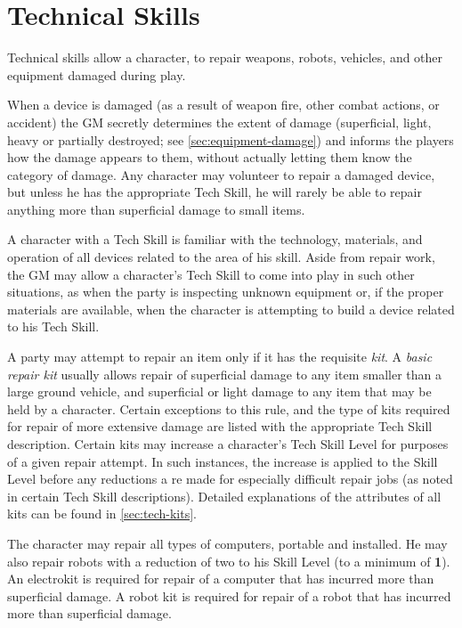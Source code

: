 \section{Technical Skills}
\label{sec:technical-skills}

Technical skills allow a character, to repair weapons, robots,
vehicles, and other equipment damaged during play.

When a device is damaged (as a result of weapon fire, other combat
actions, or accident) the GM secretly determines the extent of damage
(superficial, light, heavy or partially destroyed; see
\ref{sec:equipment-damage}) and informs the players how the damage
appears to them, without actually letting them know the category of
damage.  Any character may volunteer to repair a damaged device, but
unless he has the appropriate Tech Skill, he will rarely be able to
repair anything more than superficial damage to small items.

A character with a Tech Skill is familiar with the technology,
materials, and operation of all devices related to the area of his
skill.  Aside from repair work, the GM may allow a character's Tech
Skill to come into play in such other situations, as when the party is
inspecting unknown equipment or, if the proper materials are
available, when the character is attempting to build a device related
to his Tech Skill.

A party may attempt to repair an item only if it has the requisite
\emph{kit}.  A \emph{basic repair kit} usually allows repair of
superficial damage to any item smaller than a large ground vehicle,
and superficial or light damage to any item that may be held by a
character.  Certain exceptions to this rule, and the type of kits
required for repair of more extensive damage are listed with the
appropriate Tech Skill description.  Certain kits may increase a
character's Tech Skill Level for purposes of a given repair attempt.
In such instances, the increase is applied to the Skill Level before
any reductions a re made for especially difficult repair jobs (as
noted in certain Tech Skill descriptions).  Detailed explanations of
the attributes of all kits can be found in \ref{sec:tech-kits}.


\label{sec:skill-compu-robot-tech}

The character may repair all types of computers, portable and
installed.  He may also repair robots with a reduction of two to his
Skill Level (to a minimum of \textbf{1}).  An electrokit is required
for repair of a computer that has incurred more than superficial
damage.  A robot kit is required for repair of a robot that has
incurred more than superficial damage.

